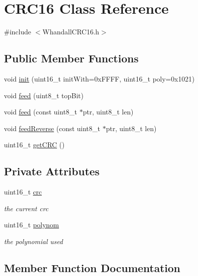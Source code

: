 \hypertarget{class_c_r_c16}{}\section{C\+R\+C16 Class Reference}
\label{class_c_r_c16}


{\ttfamily \#include $<$Whandall\+C\+R\+C16.\+h$>$}

\subsection*{Public Member Functions}
\begin{DoxyCompactItemize}
\item 
void \hyperlink{class_c_r_c16_a65bed8b421a029f5f78200b45657e86d}{init} (uint16\+\_\+t init\+With=0x\+F\+F\+F\+F, uint16\+\_\+t poly=0x1021)
\item 
void \hyperlink{class_c_r_c16_a89a04ddb806b3b62469960726d928603}{feed} (uint8\+\_\+t top\+Bit)
\item 
void \hyperlink{class_c_r_c16_a05d38b0d782f465ea7345c3ed7cafbaf}{feed} (const uint8\+\_\+t $\ast$ptr, uint8\+\_\+t len)
\item 
void \hyperlink{class_c_r_c16_a01cc3efe20c96193f230f4ec9cb43c74}{feed\+Reverse} (const uint8\+\_\+t $\ast$ptr, uint8\+\_\+t len)
\item 
uint16\+\_\+t \hyperlink{class_c_r_c16_a5c2b7692080612c117bb1c8ceb57e3bc}{get\+C\+RC} ()
\end{DoxyCompactItemize}
\subsection*{Private Attributes}
\begin{DoxyCompactItemize}
\item 
uint16\+\_\+t \hyperlink{class_c_r_c16_aae22e2b7c6b2b96d76bd04ab28caf6d4}{crc}
\begin{DoxyCompactList}\small\item\em the current crc \end{DoxyCompactList}\item 
uint16\+\_\+t \hyperlink{class_c_r_c16_a9a397960cbe3073502859d6a8e14e71e}{polynom}
\begin{DoxyCompactList}\small\item\em the polynomial used \end{DoxyCompactList}\end{DoxyCompactItemize}


\subsection{Member Function Documentation}
\mbox{\label{class_c_r_c16_a89a04ddb806b3b62469960726d928603}} 
